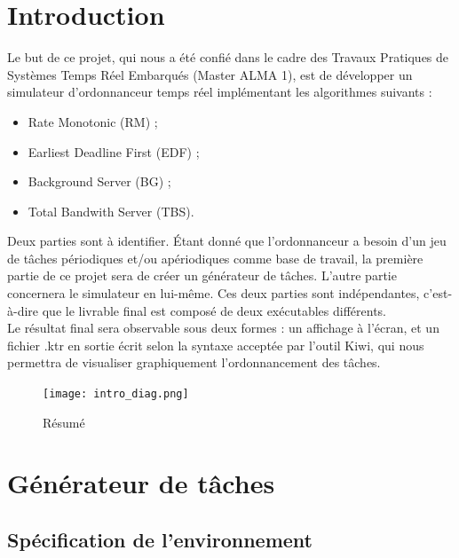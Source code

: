 \chapter*{Introduction}

	Le but de ce projet, qui nous a été confié dans le cadre des Travaux Pratiques de Systèmes Temps Réel Embarqués (Master ALMA 1), est de développer un simulateur d'ordonnanceur temps réel implémentant les algorithmes suivants :
	\begin{itemize}
		\item Rate Monotonic (RM) ;
		\item Earliest Deadline First (EDF) ;
		\item Background Server (BG) ;
		\item Total Bandwith Server (TBS).
	\end{itemize}
	
	Deux parties sont à identifier. Étant donné que l'ordonnanceur a besoin d'un jeu de tâches périodiques et/ou apériodiques comme base de travail, la première partie de ce projet sera de créer un générateur de tâches. L'autre partie concernera le simulateur en lui-même. Ces deux parties sont indépendantes, c'est-à-dire que le livrable final est composé de deux exécutables différents.\\
	
	Le résultat final sera observable sous deux formes : un affichage à l'écran, et un fichier .ktr en sortie écrit selon la syntaxe acceptée par l'outil Kiwi, qui nous permettra de visualiser graphiquement l'ordonnancement des tâches.
	\begin{figure}[h!]
		\centering
		\texttt{[image: intro\_diag.png]}
		\caption{Résumé}
	\end{figure}
	\FloatBarrier

\chapter{Générateur de tâches}
	\label{chap:1}
	
	\section{Spécification de l’environnement}
	
